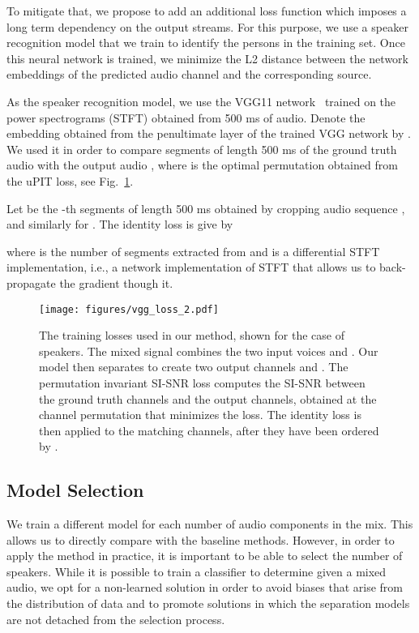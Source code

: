 \documentclass{article}
\begin{document}
To mitigate that, we propose to add an additional loss function which imposes a long term dependency on the output streams. For this purpose, we use a speaker recognition model that we train to identify the persons in the training set. Once this neural network is trained, we minimize the L2 distance between the network embeddings of the predicted audio channel and the corresponding source. 

As the speaker recognition model, we use the VGG11 network~\cite{simonyan2014very} trained on the power spectrograms (STFT) obtained from 500 ms of audio. Denote the embedding obtained from the penultimate layer of the trained VGG network by . We used it in order to compare segments of length 500 ms of the ground truth audio  with the output audio , where  is the optimal permutation obtained from the uPIT loss, see Fig.~\ref{fig:vgg_loss}.

Let  be the -th segments of length 500 ms obtained by cropping audio sequence , and similarly  for . The identity loss is give by

where  is the number of segments extracted from  and  is a differential STFT implementation, i.e., a network implementation of STFT that allows us to back-propagate the gradient though it.

\begin{figure}[t]
   \centering
       \texttt{[image: figures/vgg\_loss\_2.pdf]}
    \caption{The training losses used in our method, shown for the case of  speakers. The mixed signal  combines the two input voices  and . Our model then separates to create two output channels  and . The permutation invariant SI-SNR loss computes the SI-SNR between the ground truth channels and the output channels, obtained at the channel permutation  that minimizes the loss. The identity loss is then applied to the matching channels, after they have been ordered by .}
 \label{fig:vgg_loss}
\end{figure}

\subsection{Model Selection}
\label{sec:select}

We train a different model for each number  of audio components in the mix. This allows us to directly compare with the baseline methods. However, in order to apply the method in practice, it is important to be able to select the number of speakers. While it is possible to train a classifier to determine  given a mixed audio, we opt for a non-learned solution in order to avoid biases that arise from the distribution of data and to promote solutions in which the separation models are not detached from the selection process. 
\end{document}
